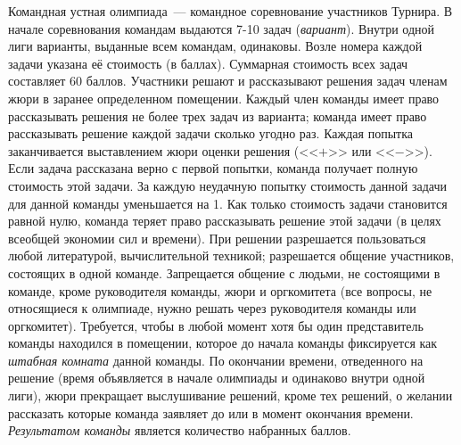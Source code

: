 Командная устная олимпиада~--- командное соревнование участников Турнира.
В начале соревнования командам выдаются 7-10 задач (\emph{вариант}).
Внутри одной лиги варианты, выданные всем командам, одинаковы.
Возле номера каждой задачи указана её стоимость (в баллах).
Суммарная стоимость всех задач составляет 60 баллов.
Участники решают и рассказывают решения задач членам жюри в заранее
определенном помещении.
Каждый член команды имеет право рассказывать решения не более трех задач из
варианта; команда имеет право рассказывать решение каждой задачи сколько угодно
раз.
Каждая попытка заканчивается выставлением жюри оценки решения
(<<$+$>> или <<$-$>>).
Если задача рассказана верно с первой попытки, команда получает полную
стоимость этой задачи.
За каждую неудачную попытку стоимость данной задачи для данной команды
уменьшается на 1.
Как только стоимость задачи становится равной нулю, команда теряет право
рассказывать решение этой задачи (в целях всеобщей экономии сил и времени).
При решении разрешается пользоваться любой литературой, вычислительной
техникой; разрешается общение участников, состоящих в одной команде.
Запрещается общение с людьми, не состоящими в команде, кроме руководителя
команды, жюри и оргкомитета (все вопросы, не относящиеся к олимпиаде, нужно
решать через руководителя команды или оргкомитет).
Требуется, чтобы в любой момент хотя бы один представитель команды находился в
помещении, которое до начала команды фиксируется как \emph{штабная комната}
данной команды.
По окончании времени, отведенного на решение (время объявляется в начале
олимпиады и одинаково внутри одной лиги), жюри прекращает выслушивание решений,
кроме тех решений, о желании рассказать которые команда заявляет до или в
момент окончания времени.
\emph{Результатом команды} является количество набранных баллов.

